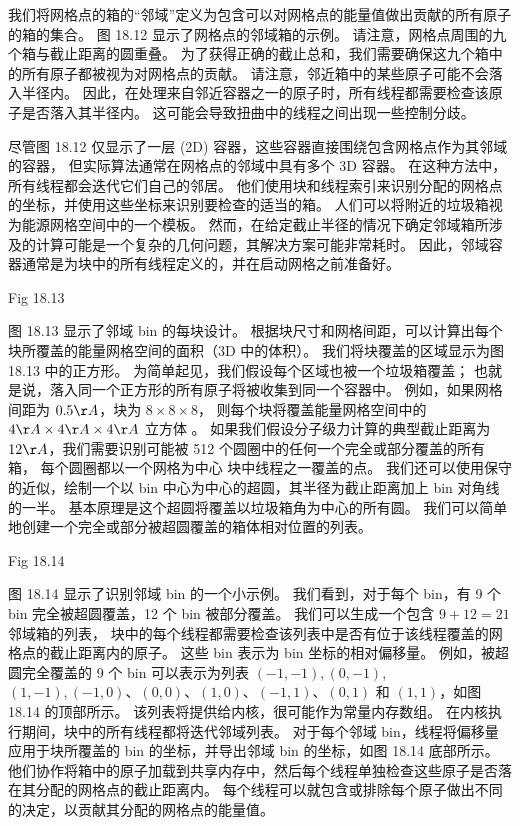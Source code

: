 我们将网格点的箱的“邻域”定义为包含可以对网格点的能量值做出贡献的所有原子的箱的集合。 
图 18.12 显示了网格点的邻域箱的示例。 请注意，网格点周围的九个箱与截止距离的圆重叠。 
为了获得正确的截止总和，我们需要确保这九个箱中的所有原子都被视为对网格点的贡献。 
请注意，邻近箱中的某些原子可能不会落入半径内。 
因此，在处理来自邻近容器之一的原子时，所有线程都需要检查该原子是否落入其半径内。 
这可能会导致扭曲中的线程之间出现一些控制分歧。

尽管图 18.12 仅显示了一层 (2D) 容器，这些容器直接围绕包含网格点作为其邻域的容器，
但实际算法通常在网格点的邻域中具有多个 3D 容器。 在这种方法中，所有线程都会迭代它们自己的邻居。 
他们使用块和线程索引来识别分配的网格点的坐标，并使用这些坐标来识别要检查的适当的箱。 
人们可以将附近的垃圾箱视为能源网格空间中的一个模板。 
然而，在给定截止半径的情况下确定邻域箱所涉及的计算可能是一个复杂的几何问题，其解决方案可能非常耗时。 
因此，邻域容器通常是为块中的所有线程定义的，并在启动网格之前准备好。

{\color{red} Fig 18.13}

图 18.13 显示了邻域 bin 的每块设计。 根据块尺寸和网格间距，可以计算出每个块所覆盖的能量网格空间的面积（3D 中的体积）。 
我们将块覆盖的区域显示为图 18.13 中的正方形。 为简单起见，我们假设每个区域也被一个垃圾箱覆盖； 
也就是说，落入同一个正方形的所有原子将被收集到同一个容器中。 
例如，如果网格间距为 $0.5 \AA$，块为 $8 \times 8 \times 8$，
则每个块将覆盖能量网格空间中的 $4 \AA \times 4 \AA \times 4 \AA$ 立方体 。 
如果我们假设分子级力计算的典型截止距离为 $12 \AA$，我们需要识别可能被 512 个圆圈中的任何一个完全或部分覆盖的所有箱，
每个圆圈都以一个网格为中心 块中线程之一覆盖的点。 
我们还可以使用保守的近似，绘制一个以 bin 中心为中心的超圆，其半径为截止距离加上 bin 对角线的一半。 
基本原理是这个超圆将覆盖以垃圾箱角为中心的所有圆。 我们可以简单地创建一个完全或部分被超圆覆盖的箱体相对位置的列表。

{\color{red} Fig 18.14}

图 18.14 显示了识别邻域 bin 的一个小示例。 我们看到，对于每个 bin，有 9 个 bin 完全被超圆覆盖，12 个 bin 被部分覆盖。 
我们可以生成一个包含 $9+12=21$ 邻域箱的列表，
块中的每个线程都需要检查该列表中是否有位于该线程覆盖的网格点的截止距离内的原子。 
这些 bin 表示为 bin 坐标的相对偏移量。 
例如，被超圆完全覆盖的 9 个 bin 可以表示为列表 $(-1,-1),(0,-1)$, $(1,-1),(-1,0) 、(0,0)、(1,0)、(-1,1)、(0,1)$ 和 $(1,1)$，如图 18.14 的顶部所示。 
该列表将提供给内核，很可能作为常量内存数组。 
在内核执行期间，块中的所有线程都将迭代邻域列表。 
对于每个邻域 bin，线程将偏移量应用于块所覆盖的 bin 的坐标，并导出邻域 bin 的坐标，如图 18.14 底部所示。 
他们协作将箱中的原子加载到共享内存中，然后每个线程单独检查这些原子是否落在其分配的网格点的截止距离内。 
每个线程可以就包含或排除每个原子做出不同的决定，以贡献其分配的网格点的能量值。

